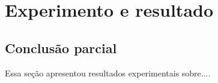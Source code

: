 
\clearpage
\section{Experimento e resultado} \label{sec:exp_result}

\subsection{Conclusão parcial}

Essa seção apresentou resultados experimentais sobre.... 